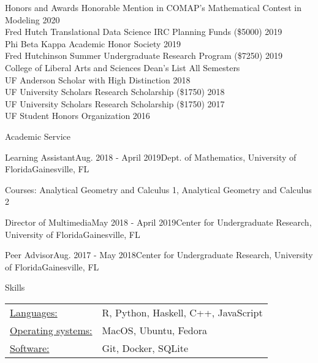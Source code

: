\documentclass{resume}
\begin{document}
  \begin{rSection}{Honors and Awards}
  Honorable Mention in COMAP's Mathematical
  Contest in Modeling \hfill 2020 \\
  Fred Hutch Translational Data Science IRC Planning Funds (\$5000) \hfill 2019 \\
  Phi Beta Kappa Academic Honor Society \hfill 2019 \\
  Fred Hutchinson Summer Undergraduate Research Program (\$7250) \hfill 2019 \\
  College of Liberal Arts and Sciences Dean's List \hfill All Semesters \\
  UF Anderson Scholar with High Distinction \hfill 2018 \\
  UF University Scholars Research Scholarship (\$1750) \hfill 2018 \\
  UF University Scholars Research Scholarship (\$1750) \hfill 2017 \\
  UF Student Honors Organization \hfill 2016 
 \end{rSection}

 
\begin{rSection}{Academic Service}
  
\begin{rSubsection}{Learning Assistant}{Aug. 2018 - April
    2019}{Dept. of Mathematics, University of Florida}{Gainesville,
    FL}
   \item Courses: Analytical Geometry and Calculus 1, Analytical
    Geometry and Calculus 2
  \end{rSubsection}



 \begin{rSubsectionEmpty}{Director of Multimedia}{May 2018 - April 2019}{Center for Undergraduate Research, University of Florida}{Gainesville, FL}
\end{rSubsectionEmpty}


\begin{rSubsectionEmpty}{Peer Advisor}{Aug. 2017 - May 2018}{Center for Undergraduate Research, University of Florida}{Gainesville, FL}
  \end{rSubsectionEmpty}

\end{rSection}
  

\begin{rSection}{Skills}
   \begin{tabular}{l p{3in}}
    \underline{Languages:} & R, Python, Haskell, C++, JavaScript \\
    \underline{Operating systems:} & MacOS, Ubuntu, Fedora \\
     \underline{Software:} & Git, Docker, SQLite
 \end{tabular}
\end{rSection}
\end{document}
